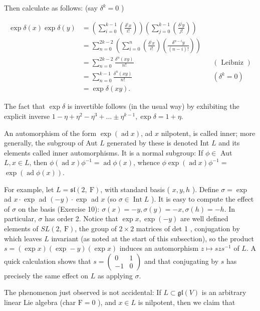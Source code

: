 \documentclass[10pt]{article}
\begin{document}
Then calculate as follows: (say $\delta^{k}=0$ )

$$
\begin{aligned}
\exp \delta(x) \exp \delta(y) & =\left(\sum_{i=0}^{k-1}\left(\frac{\delta^{i} x}{i!}\right)\right)\left(\sum_{j=0}^{k-1}\left(\frac{\delta^{j} y}{j!}\right)\right) & & \\
& =\sum_{n=0}^{2 k-2}\left(\sum_{i=0}^{n}\left(\frac{\delta^{i} x}{i!}\right)\left(\frac{\delta^{n-i} y}{(n-i)!}\right)\right) & & \\
& =\sum_{n=0}^{2 k-2} \frac{\delta^{n}(x y)}{n!} & & (\text { Leibniz }) \\
& =\sum_{n=0}^{k-1} \frac{\delta^{n}(x y)}{n!} & & \left(\delta^{k}=0\right) \\
& =\exp \delta(x y) . & &
\end{aligned}
$$

The fact that $\exp \delta$ is invertible follows (in the usual way) by exhibiting the explicit inverse $1-\eta+\eta^{2}-\eta^{3}+\ldots \pm \eta^{k-1}, \exp \delta=1+\eta$.

An automorphism of the form $\exp (\operatorname{ad} x)$, ad $x$ nilpotent, is called inner; more generally, the subgroup of Aut $L$ generated by these is denoted Int $L$ and its elements called inner automorphisms. It is a normal subgroup: If $\phi \in$ Aut $L, x \in L$, then $\phi(\operatorname{ad} x) \phi^{-1}=\operatorname{ad} \phi(x)$, whence $\phi \exp (\operatorname{ad} x) \phi^{-1}=$ $\exp (\operatorname{ad} \phi(x))$.

For example, let $L=\mathfrak{s l}(2, \mathrm{~F})$, with standard basis ( $x, y, h$ ). Define $\sigma=\exp$ ad $x \cdot \exp$ ad $(-y) \cdot \exp$ ad $x$ (so $\sigma \in \operatorname{Int} L$ ). It is easy to compute the effect of $\sigma$ on the basis (Exercise 10): $\sigma(x)=-y, \sigma(y)=-x, \sigma(h)=-h$. In particular, $\sigma$ has order 2. Notice that $\exp x, \exp (-y)$ are well defined elements of $S L(2, \mathrm{~F})$, the group of $2 \times 2$ matrices of det 1 , conjugation by which leaves $L$ invariant (as noted at the start of this subsection), so the product $s=(\exp x)(\exp -y)(\exp x)$ induces an automorphism $z \mapsto s z s^{-1}$ of $L$. A quick calculation shows that $s=\left(\begin{array}{rr}0 & 1 \\ -1 & 0\end{array}\right)$ and that conjugating by $s$ has precisely the same effect on $L$ as applying $\sigma$.

The phenomenon just observed is not accidental: If $L \subset \mathfrak{g l}(V)$ is an arbitrary linear Lie algebra (char $\mathrm{F}=0$ ), and $x \in L$ is nilpotent, then we claim that
\end{document}
